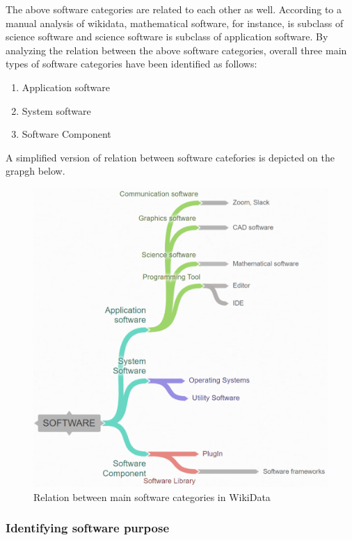 The above software categories are related to each other as well. According to a manual analysis of wikidata, mathematical software, for instance, is subclass of science software and science software is subclass of application software. By analyzing the relation between the above software categories, overall three main types of software categories have been identified as follows:

\begin{enumerate}
 \item Application software 
 \item System software 
 \item Software Component 

\end{enumerate}

A simplified version of relation between software catefories is depicted on the grapgh below. 

\begin{figure}[htbp]
	\centering
	\includegraphics[width=1\textwidth]{4.graphics/figures/chart}
	\caption{Relation between main software categories in WikiData}
	\label{fig:chapter03:setup}
\end{figure}


\subsubsection{Identifying software purpose    }

